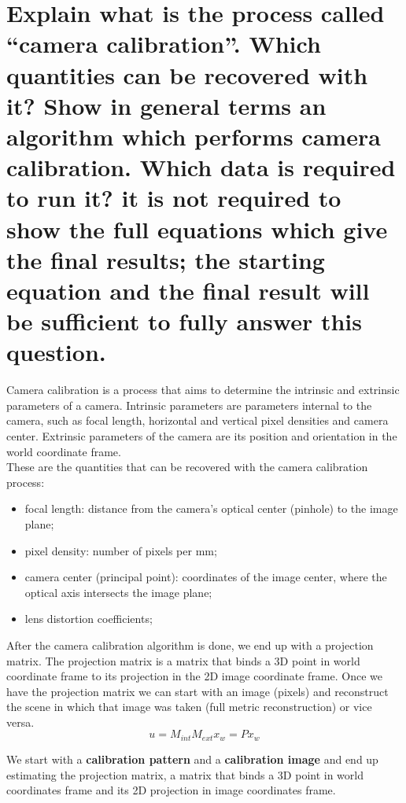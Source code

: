 \documentclass{article}
\begin{document}
\section{Explain what is the process called “camera calibration”. Which quantities can be recovered with it? Show in general terms an algorithm which performs camera calibration. Which data is required to run it? it is not required to show the full equations which give the final results; the starting equation and the final result will be sufficient to fully answer this question.}

Camera calibration is a process that aims to determine the intrinsic and extrinsic parameters of a camera. Intrinsic parameters are parameters internal to the camera, such as focal length, horizontal and vertical pixel densities and camera center. Extrinsic parameters of the camera are its position and orientation in the world coordinate frame. \\

These are the quantities that can be recovered with the camera calibration process:
\begin{itemize}
    \item focal length: distance from the camera's optical center (pinhole) to the image plane;
    \item pixel density: number of pixels per mm;
    \item camera center (principal point): coordinates of the image center, where the optical axis intersects the image plane;
    \item lens distortion coefficients;
\end{itemize}

After the camera calibration algorithm is done, we end up with a projection matrix. The projection matrix is a matrix that binds a 3D point in world coordinate frame to its projection in the 2D image coordinate frame. Once we have the projection matrix we can start with an image (pixels) and reconstruct the scene in which that image was taken (full metric reconstruction) or vice versa. \\

\begin{equation*}
    u = M_{int} M_{ext} x_w = P x_w
\end{equation*}

We start with a \textbf{calibration pattern} and a \textbf{calibration image} and end up estimating the projection matrix, a matrix that binds a 3D point in world coordinates frame and its 2D projection in image coordinates frame.
\end{document}
